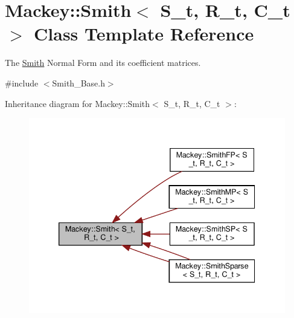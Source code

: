 \hypertarget{classMackey_1_1Smith}{}\section{Mackey\+:\+:Smith$<$ S\+\_\+t, R\+\_\+t, C\+\_\+t $>$ Class Template Reference}
\label{classMackey_1_1Smith}


The \hyperlink{classMackey_1_1Smith}{Smith} Normal Form and its coefficient matrices.  




{\ttfamily \#include $<$Smith\+\_\+\+Base.\+h$>$}



Inheritance diagram for Mackey\+:\+:Smith$<$ S\+\_\+t, R\+\_\+t, C\+\_\+t $>$\+:\nopagebreak
\begin{figure}[H]
\begin{center}
\leavevmode
\includegraphics[width=339pt]{classMackey_1_1Smith__inherit__graph}
\end{center}
\end{figure}
